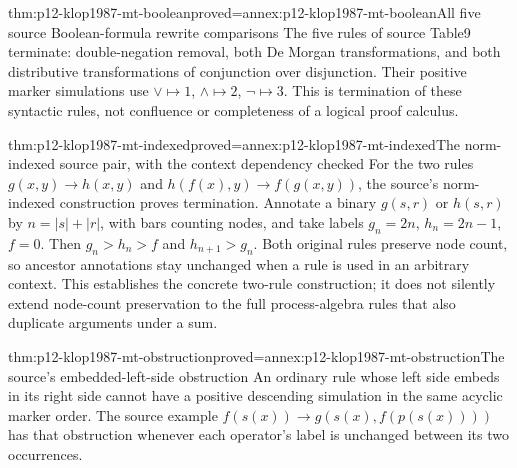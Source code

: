\begin{hbtheorem}{thm:p12-klop1987-mt-boolean}{proved=annex:p12-klop1987-mt-boolean}{All five source Boolean-formula rewrite comparisons}
The five rules of source Table9 terminate: double-negation removal,
both De Morgan transformations, and both distributive transformations
of conjunction over disjunction. Their positive marker simulations
use \(\lor\mapsto1\), \(\land\mapsto2\), \(\neg\mapsto3\).
This is termination of these syntactic rules, not confluence or
completeness of a logical proof calculus.
\end{hbtheorem}

\begin{hbtheorem}{thm:p12-klop1987-mt-indexed}{proved=annex:p12-klop1987-mt-indexed}{The norm-indexed source pair, with the context dependency checked}
For the two rules \(g(x,y)\to h(x,y)\) and
\(h(f(x),y)\to f(g(x,y))\), the source's norm-indexed construction
proves termination. Annotate a binary \(g(s,r)\) or \(h(s,r)\)
by \(n=|s|+|r|\), with bars counting nodes, and take labels
\(g_n=2n\), \(h_n=2n-1\), \(f=0\).
Then \(g_n>h_n>f\) and \(h_{n+1}>g_n\).
Both original rules preserve node count, so ancestor annotations
stay unchanged when a rule is used in an arbitrary context.
This establishes the concrete two-rule construction; it does not
silently extend node-count preservation to the full process-algebra
rules that also duplicate arguments under a sum.
\end{hbtheorem}

\begin{hbcorollary}{thm:p12-klop1987-mt-obstruction}{proved=annex:p12-klop1987-mt-obstruction}{The source's embedded-left-side obstruction}
An ordinary rule whose left side embeds in its right side cannot have
a positive descending simulation in the same acyclic marker order.
The source example \(f(s(x))\to g(s(x),f(p(s(x))))\) has that
obstruction whenever each operator's label is unchanged between its
two occurrences.
\end{hbcorollary}


